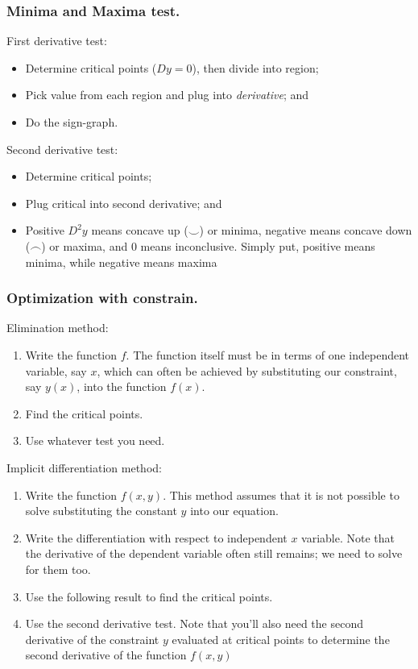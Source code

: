 \documentclass[../main.tex]{subfiles}
\begin{document}
\subsubsection*{Minima and Maxima test.} First derivative test:
\begin{itemize}
    \item Determine critical points ($ Dy=0$), then divide into region;
    \item Pick value from each region and plug into \emph{derivative}; and
    \item Do the sign-graph.
\end{itemize}
Second derivative test:
\begin{itemize}
    \item Determine critical points;
    \item Plug critical into second derivative; and
    \item Positive $ D^2y$ means concave up ($\smile$) or minima, negative means concave down ($\frown$) or maxima, and 0 means inconclusive. Simply put, positive means minima, while negative means maxima
\end{itemize}

\subsubsection*{Optimization with constrain.} Elimination method:
\begin{enumerate}
    \item Write the function $f$. The function itself must be in terms of one independent variable, say $x$, which can often be achieved by substituting our constraint, say $y(x)$, into the function $f(x)$.
    \item Find the critical points.
    \item Use whatever test you need.
\end{enumerate}
Implicit differentiation method:
\begin{enumerate}
    \item Write the function $f(x,y)$. This method assumes that it is not possible to solve substituting the constant $y$ into our equation.
    \item Write the differentiation with respect to independent $x$ variable. Note that the derivative of the dependent variable often still remains; we need to solve for them too.
    \item Use the following result to find the critical points.
    \item Use the second derivative test. Note that you'll also need the second derivative of the constraint $y$ evaluated at critical points to determine the second derivative of the function $f(x,y)$
\end{enumerate}
\end{document}

